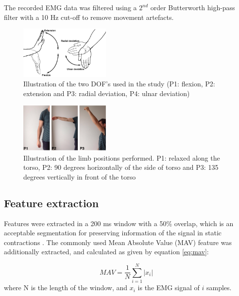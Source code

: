 \documentclass[a4paper, 10pt, conference]{ieeeconf}      %
\begin{document}
The recorded EMG data was filtered using a $2^{nd}$ order Butterworth high-pass filter with a 10 Hz cut-off to remove movement artefacts. 

\begin{figure}[H]
	\centering
	\includegraphics[width=0.4\textwidth]{Figures/wristmovement}  %
	\caption{Illustration of the two DOF's used in the study (P1: flexion, P2: extension and P3: radial deviation, P4: ulnar deviation)}
	\label{fig:wristmovement}  %
\end{figure}

\begin{figure}[H]
	\centering
	\includegraphics[width=0.4\textwidth]{Figures/limb_pos}  %
	\caption{Illustration of the limb positions performed. P1: relaxed along the torso, P2: 90 degrees horizontally of the side of torso and P3: 135 degrees vertically in front of the torso}
	\label{fig:limbpositions}  %
\end{figure}

\subsection{Feature extraction}
Features were extracted in a 200 ms window with a 50\% overlap, which is an acceptable segmentation for preserving information of the signal in static contractions \cite{Farfan2010}.
The commonly used Mean Absolute Value (MAV) feature was additionally extracted, and calculated as given by equation \ref{eq:mav}: \cite{Zecca2002} 

\begin{equation} \label{eq:mav}
MAV = \frac{1}{N}\sum\limits_{i=1}^N|x_i|
\end{equation}
where N is the length of the window, and $x_i$ is the EMG signal of $i$ samples.
\end{document}
